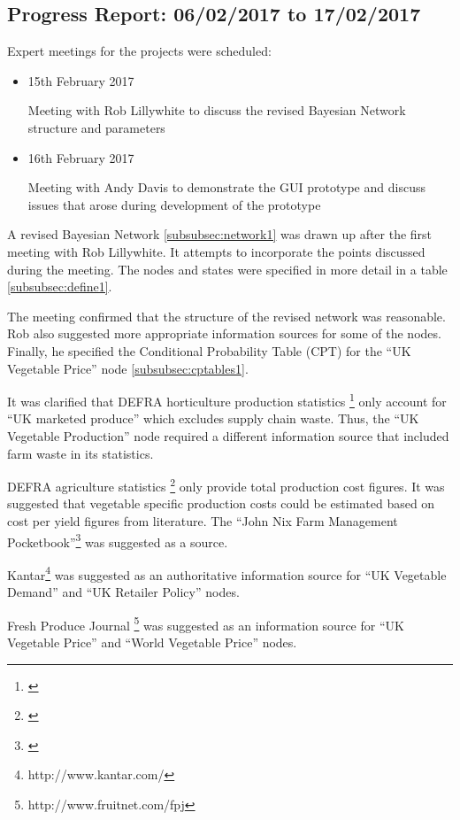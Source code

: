 \documentclass[12pt,notitlepage]{article}
\begin{document}
\begin{multicols*}{2}
\subsection{Progress Report: 06/02/2017 to 17/02/2017}\label{subsec:progress3}
Expert meetings for the projects were scheduled:
\begin{itemize}
\item 15th February 2017

Meeting with Rob Lillywhite to discuss the revised Bayesian Network structure and parameters

\item 16th February 2017

Meeting with Andy Davis to demonstrate the GUI prototype and discuss issues that arose during development of the prototype
\end{itemize}

A revised Bayesian Network \ref{subsubsec:network1} was drawn up after the first meeting with Rob Lillywhite. It attempts to incorporate the points discussed during the meeting. The nodes and states were specified in more detail in a table \ref{subsubsec:define1}.

The meeting confirmed that the structure of the revised network was reasonable. Rob also suggested more appropriate information sources for some of the nodes. Finally, he specified the Conditional Probability Table (CPT) for the ``UK Vegetable Price'' node \ref{subsubsec:cptables1}.

It was clarified that DEFRA horticulture production statistics \footnote{\cite{defra2016a}} only account for ``UK marketed produce'' which excludes supply chain waste. Thus, the ``UK Vegetable Production'' node required a different information source that included farm waste in its statistics.

DEFRA agriculture statistics \footnote{\cite{defra2016b}} only provide total production cost figures. It was suggested that vegetable specific production costs could be estimated based on cost per yield figures from literature. The ``John Nix Farm Management Pocketbook''\footnote{\cite{nix2015}} was suggested as a source.

Kantar\footnote{http://www.kantar.com/} was suggested as an authoritative information source for ``UK Vegetable Demand'' and ``UK Retailer Policy'' nodes.

Fresh Produce Journal \footnote{http://www.fruitnet.com/fpj} was suggested as an information source for ``UK Vegetable Price'' and ``World Vegetable Price'' nodes.


\end{multicols*}
\end{document}
